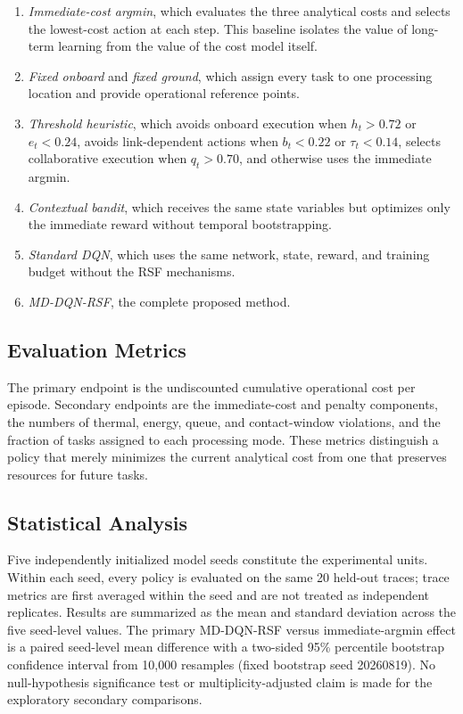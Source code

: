 \documentclass[lettersize,journal]{IEEEtran}
\begin{document}
\begin{enumerate}
    \item \textit{Immediate-cost argmin}, which evaluates the three analytical costs and selects the lowest-cost action at each step. This baseline isolates the value of long-term learning from the value of the cost model itself.
    \item \textit{Fixed onboard} and \textit{fixed ground}, which assign every task to one processing location and provide operational reference points.
    \item \textit{Threshold heuristic}, which avoids onboard execution when $h_t>0.72$ or $e_t<0.24$, avoids link-dependent actions when $b_t<0.22$ or $\tau_t<0.14$, selects collaborative execution when $q_t>0.70$, and otherwise uses the immediate argmin.
    \item \textit{Contextual bandit}, which receives the same state variables but optimizes only the immediate reward without temporal bootstrapping.
    \item \textit{Standard DQN}, which uses the same network, state, reward, and training budget without the RSF mechanisms.
    \item \textit{MD-DQN-RSF}, the complete proposed method.
\end{enumerate}

\subsection{Evaluation Metrics}

The primary endpoint is the undiscounted cumulative operational cost per episode. Secondary endpoints are the immediate-cost and penalty components, the numbers of thermal, energy, queue, and contact-window violations, and the fraction of tasks assigned to each processing mode. These metrics distinguish a policy that merely minimizes the current analytical cost from one that preserves resources for future tasks.

\subsection{Statistical Analysis}

Five independently initialized model seeds constitute the experimental units. Within each seed, every policy is evaluated on the same 20 held-out traces; trace metrics are first averaged within the seed and are not treated as independent replicates. Results are summarized as the mean and standard deviation across the five seed-level values. The primary MD-DQN-RSF versus immediate-argmin effect is a paired seed-level mean difference with a two-sided 95\% percentile bootstrap confidence interval from 10,000 resamples (fixed bootstrap seed 20260819). No null-hypothesis significance test or multiplicity-adjusted claim is made for the exploratory secondary comparisons.
\end{document}
